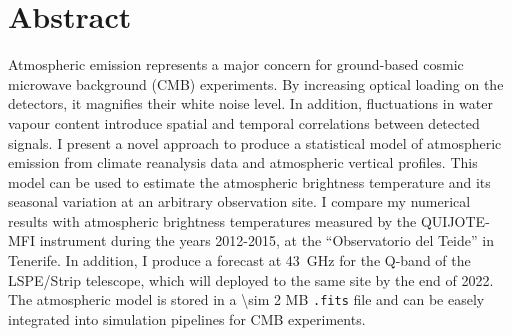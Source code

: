 \section*{\centering Abstract}

\thispagestyle{empty}

Atmospheric emission represents a major concern for ground-based cosmic
microwave background (CMB) experiments. By increasing optical loading on the
detectors, it magnifies their white noise level. In addition, fluctuations
in water vapour content introduce spatial and temporal correlations between
detected signals. I present a novel approach to produce a statistical model
of atmospheric emission from climate reanalysis data and atmospheric
vertical profiles.  This model can be used to estimate the atmospheric
brightness temperature and its seasonal variation at an arbitrary
observation site.  I compare my numerical results with atmospheric
brightness temperatures measured by the QUIJOTE-MFI instrument during the
years 2012-2015, at the ``Observatorio del Teide'' in Tenerife. In
addition, I produce a forecast at \SI{43}{\giga\hertz} for the Q-band of
the LSPE/Strip telescope, which will deployed to the same site by the end
of 2022.  The atmospheric model is stored in a \num{\sim 2} MB
\texttt{.fits} file and can be easely integrated into simulation pipelines
for CMB experiments.
